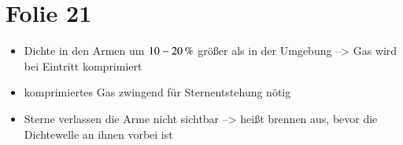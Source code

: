 \newpage

\section{Folie 21}

\begin{itemize}
\item Dichte in den Armen um $\unit[10-20]{\%}$ größer als in der Umgebung --> Gas wird bei Eintritt komprimiert
\item komprimiertes Gas zwingend für Sternentstehung nötig
\item Sterne verlassen die Arme nicht sichtbar --> heißt brennen aus, bevor die Dichtewelle an ihnen vorbei ist
\end{itemize}



